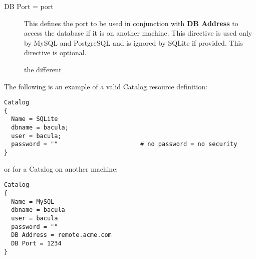 \begin{description}
\item [DB Port = \lt{}port\gt{}]
   This defines the port to  be used in conjunction with {\bf DB Address} to
   access the  database if it is on another machine. This directive is used  only
   by MySQL and PostgreSQL and is ignored by SQLite if provided.  This
   directive is optional.

the
different


\end{description}

The following is an example of a valid Catalog resource definition: 

\footnotesize
\begin{verbatim}
Catalog
{
  Name = SQLite
  dbname = bacula;
  user = bacula;
  password = ""                       # no password = no security
}
\end{verbatim}
\normalsize

or for a Catalog on another machine: 

\footnotesize
\begin{verbatim}
Catalog
{
  Name = MySQL
  dbname = bacula
  user = bacula
  password = ""
  DB Address = remote.acme.com
  DB Port = 1234
}
\end{verbatim}
\normalsize

